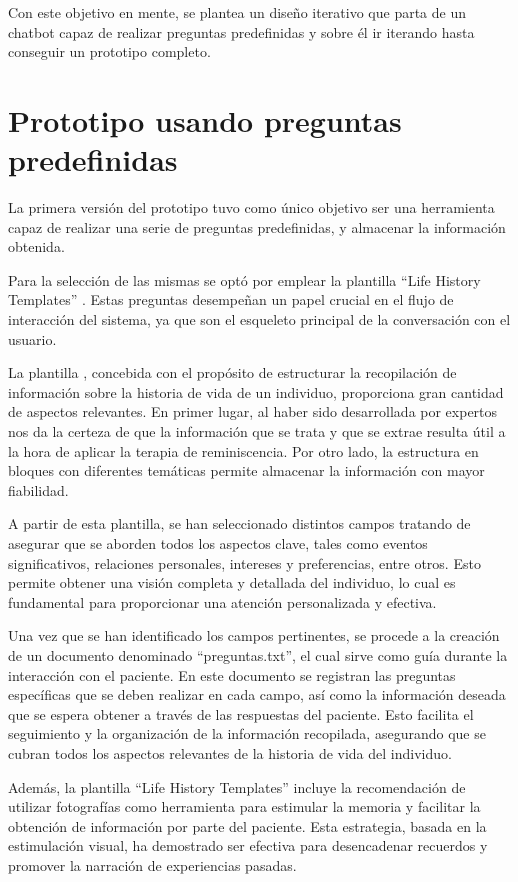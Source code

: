 Con este objetivo en mente, se plantea un diseño iterativo que parta de un chatbot capaz de realizar preguntas predefinidas y sobre él ir iterando hasta conseguir un prototipo completo.

\section{Prototipo usando preguntas predefinidas}
\label{ssubsec:seleccionpreguntas}
La primera versión del prototipo tuvo como único objetivo ser una herramienta capaz de realizar una serie de preguntas predefinidas, y almacenar la información obtenida.

Para la selección de las mismas se optó por emplear la plantilla ``Life History Templates'' \cite{dementia}. Estas preguntas desempeñan un papel crucial en el flujo de interacción del sistema, ya que son el esqueleto principal de la conversación con el usuario. 

La plantilla \cite{dementia}, concebida con el propósito de estructurar la recopilación de información sobre la historia de vida de un individuo, proporciona gran cantidad de aspectos relevantes. En primer lugar, al haber sido desarrollada por expertos nos da la certeza de que la información que se trata y que se extrae resulta útil a la hora de aplicar la terapia de reminiscencia. Por otro lado, la estructura en bloques con diferentes temáticas permite almacenar la información con mayor fiabilidad. 

A partir de esta plantilla, se han seleccionado distintos campos tratando de asegurar que se aborden todos los aspectos clave, tales como eventos significativos, relaciones personales, intereses y preferencias, entre otros. Esto permite obtener una visión completa y detallada del individuo, lo cual es fundamental para proporcionar una atención personalizada y efectiva.

Una vez que se han identificado los campos pertinentes, se procede a la creación de un documento denominado ``preguntas.txt'', el cual sirve como guía durante la interacción con el paciente. En este documento se registran las preguntas específicas que se deben realizar en cada campo, así como la información deseada que se espera obtener a través de las respuestas del paciente. Esto facilita el seguimiento y la organización de la información recopilada, asegurando que se cubran todos los aspectos relevantes de la historia de vida del individuo.

Además, la plantilla ``Life History Templates'' incluye la recomendación de utilizar fotografías como herramienta para estimular la memoria y facilitar la obtención de información por parte del paciente. Esta estrategia, basada en la estimulación visual, ha demostrado ser efectiva para desencadenar recuerdos y promover la narración de experiencias pasadas.

